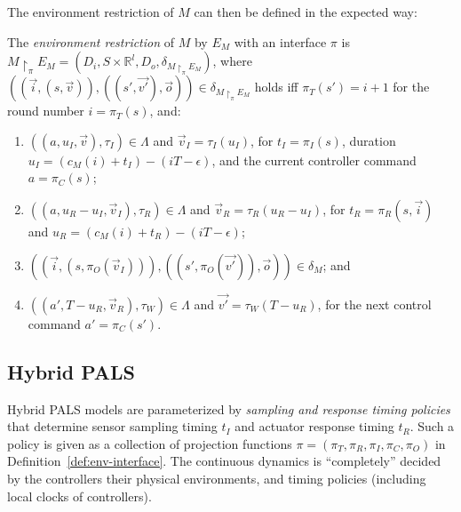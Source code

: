 The environment restriction of $M$ can then be defined in the expected way:

\begin{definition}
\label{def:env-res}
The \emph{environment restriction} of $M$ by $E_M$ 
with an interface $\pi$ is %
$M \restriction_\pi E_M = (D_i, S \times \mathbb{R}^l, D_o, \delta_{M \restriction_\pi E_M})$,
where
$( (\vec{i}, (s,\vec{v})), ((s',\vec{v'}), \vec{o}) ) \in \delta_{M \restriction_\pi E_M}$ holds iff
 $\pi_T(s') = i + 1$ for the round number $i = \pi_T(s)$, and:
\begin{enumerate}
    \item %
    $((a,u_I,\vec{v}),\tau_I) \in \Lambda$ and $\vec{v}_I = \tau_I(u_I)$,
    for  $t_I = \pi_I(s)$, duration $u_I = (c_M(i)+t_I)-(iT-\epsilon)$, and
    the current controller command $a = \pi_C(s)$;

    \item %
    $((a,u_R-u_I,\vec{v}_I),\tau_R) \in \Lambda$ and $\vec{v}_R = \tau_R(u_R-u_I)$,
    for $t_R = \pi_R(s,\vec{i})$ and $u_R = (c_M(i)+t_R) - (iT-\epsilon)$;

    \item %
    $( (\vec{i}, (s,\pi_O(\vec{v}_I))), ((s',\pi_O(\vec{v'})), \vec{o}) ) \in \delta_{M}$; and
    
    \item %
    $((a',T - u_R,\vec{v}_R),\tau_W) \in \Lambda$ and  $\vec{v'} = \tau_W(T - u_R)$,
    for the next control command $a' = \pi_C(s')$.
\end{enumerate}
\end{definition}



\subsection{Hybrid PALS}

Hybrid PALS models are parameterized by \emph{sampling and response timing policies}
that 
determine sensor sampling timing $t_I$ and actuator response timing $t_R$.
Such a policy 
is given as a collection of 
projection functions $\pi=(\pi_T, \pi_R, \pi_I, \pi_C, \pi_O)$ 
in Definition~\ref{def:env-interface}.
The continuous dynamics %
is ``completely'' decided  
by the controllers %
their physical environments, and timing policies (including local clocks of controllers). 


